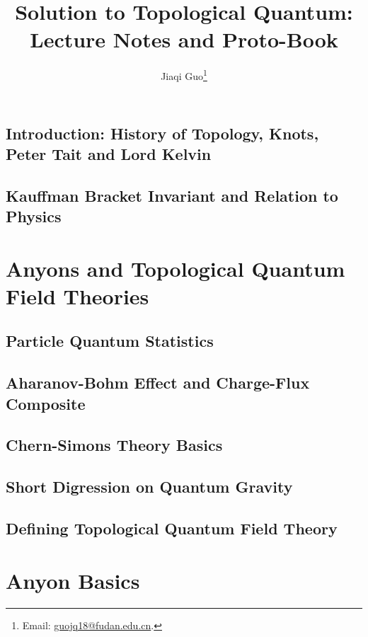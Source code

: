 \documentclass{book}
\title{Solution to Topological Quantum: Lecture Notes and Proto-Book}
\author{Jiaqi Guo\footnote{Email: \href{mailto:guojq18@fudan.edu.cn}{guojq18@fudan.edu.cn}.}}
\begin{document}
\maketitle
\tableofcontents

\chapter{Introduction: History of Topology, Knots, Peter Tait and Lord Kelvin}

\chapter{Kauffman Bracket Invariant and Relation to Physics}


\part{Anyons and Topological Quantum Field Theories}

\chapter{Particle Quantum Statistics}


\chapter{Aharanov-Bohm Effect and Charge-Flux Composite}
    

\chapter{Chern-Simons Theory Basics}


\chapter{Short Digression on Quantum Gravity}

\chapter{Defining Topological Quantum Field Theory}

\part{Anyon Basics}
\end{document}
